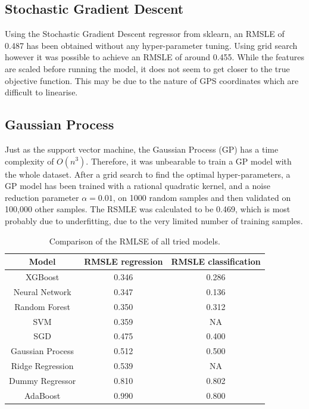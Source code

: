 \documentclass[a4paper]{article}
\begin{document}
\subsection{Stochastic Gradient Descent}
Using the Stochastic Gradient Descent regressor from sklearn, an RMSLE of 0.487
has been obtained without any hyper-parameter tuning. Using grid search however
it was possible to achieve an RMSLE of around 0.455. While the features are
scaled before running the model, it does not seem to get closer to the true
objective function. This may be due to the nature of GPS coordinates which are
difficult to linearise.

\subsection{Gaussian Process}
Just as the support vector machine, the Gaussian Process (GP) has a time
complexity of $O(n^3)$. Therefore, it was unbearable to train a GP model with
the whole dataset. After a grid search to find the optimal hyper-parameters, a
GP model has been trained with a rational quadratic kernel, and a noise
reduction parameter $\alpha=0.01$, on 1000 random samples and then validated on
100,000 other samples. The RSMLE was calculated to be 0.469, which is most
probably due to underfitting, due to the very limited number of training
samples.

\begin{table}[h!]
    \centering
    \begin{tabular}{ccc}
        Model & RMSLE regression & RMSLE classification\\
        \hline
        XGBoost & 0.346 & 0.286 \\
        Neural Network & 0.347 & 0.136 \\
        Random Forest & 0.350 & 0.312 \\
        SVM & 0.359 & NA \\
        SGD & 0.475 & 0.400 \\
        Gaussian Process & 0.512 & 0.500 \\
        Ridge Regression & 0.539 & NA \\
        Dummy Regressor & 0.810 & 0.802 \\
        AdaBoost & 0.990 & 0.800 \\
        \hline
    \end{tabular}
    \caption{Comparison of the RMLSE of all tried models.}
    \label{results}
\end{table}
\end{document}
